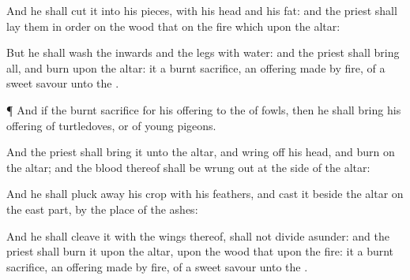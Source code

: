 {And he shall
cut it into his
pieces, with his
head and his
fat: and the
priest shall lay them in
order on the
wood that
{} on the
fire which
{} upon the
altar:

But he shall
wash the
inwards and the
legs with
water: and the
priest shall
bring
{} all, and
burn
{} upon the
altar: it
{} a burnt
sacrifice, an offering made by
fire, of a
sweet
savour unto the
{}.


\par }{\PP {}¶ And if the burnt
sacrifice for his
offering to the
{}
{} of
fowls, then he shall
bring his
offering of
turtledoves, or of
young
pigeons.

And the
priest shall
bring it unto the
altar, and wring
off his
head, and
burn
{} on the
altar; and the
blood thereof shall be wrung
out at the
side of the
altar:

And he shall pluck
away his
crop with his
feathers, and
cast it
beside the
altar on the east
part, by the
place of the
ashes:

And he shall
cleave it with the
wings thereof,
{} shall not divide
{}
asunder: and the
priest shall
burn it upon the
altar, upon the
wood that
{} upon the
fire: it
{} a burnt
sacrifice, an offering made by
fire, of a
sweet
savour unto the
{}.




\par }
